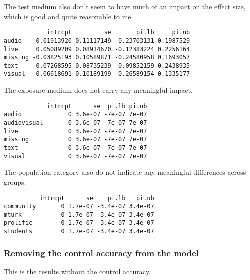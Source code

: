 \documentclass[
  letterpaper,
  DIV=11,
  numbers=noendperiod]{scrartcl}
\begin{document}
The test medium also don't seem to have much of an impact on the effect
size, which is good and quite reasonable to me.

\begin{verbatim}
            intrcpt         se       pi.lb     pi.ub
audio   -0.01913920 0.11117149 -0.23703131 0.1987529
live     0.05089209 0.08914670 -0.12383224 0.2256164
missing -0.03825193 0.10589871 -0.24580958 0.1693057
text     0.07268595 0.08735239 -0.09852159 0.2438935
visual  -0.06618691 0.10189199 -0.26589154 0.1335177
\end{verbatim}

The exposure medium does not carry any meaningful impact.

\begin{verbatim}
            intrcpt      se  pi.lb pi.ub
audio             0 3.6e-07 -7e-07 7e-07
audiovisual       0 3.6e-07 -7e-07 7e-07
live              0 3.6e-07 -7e-07 7e-07
missing           0 3.6e-07 -7e-07 7e-07
text              0 3.6e-07 -7e-07 7e-07
visual            0 3.6e-07 -7e-07 7e-07
\end{verbatim}

The population category also do not indicate any meaningful differences
across groups.

\begin{verbatim}
          intrcpt      se    pi.lb   pi.ub
community       0 1.7e-07 -3.4e-07 3.4e-07
mturk           0 1.7e-07 -3.4e-07 3.4e-07
prolific        0 1.7e-07 -3.4e-07 3.4e-07
students        0 1.7e-07 -3.4e-07 3.4e-07
\end{verbatim}

\hypertarget{removing-the-control-accuracy-from-the-model}{%
\subsubsection{Removing the control accuracy from the
model}\label{removing-the-control-accuracy-from-the-model}}

This is the results without the control accuracy.
\end{document}
